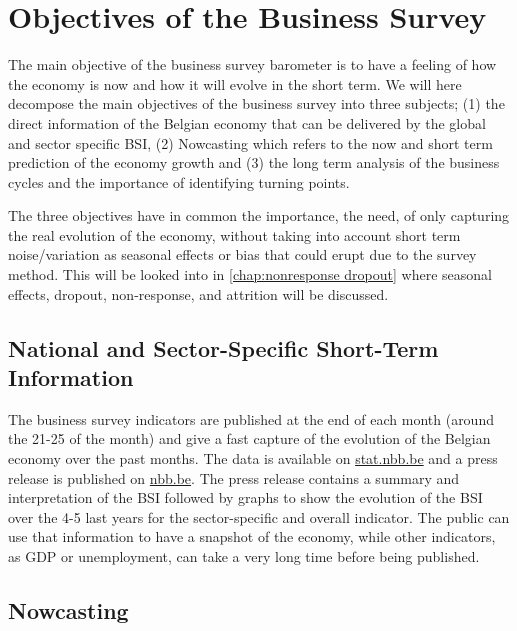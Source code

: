 \documentclass[12pt,a4paper,oneside]{book}
\begin{document}
\section{Objectives of the Business Survey}
\label{section:Objective}


The main objective of the business survey barometer is to have a feeling of how the economy is now and how it will evolve in the short term.
We will here decompose the main objectives of the business survey into three subjects; (1) the direct information of the Belgian economy that can be delivered by the global and sector specific BSI, (2) Nowcasting which refers to the now and short term prediction of the economy growth and (3) the long term analysis of the business cycles and the importance of identifying turning points.

The three objectives have in common the importance, the need,  of only capturing the real evolution of the economy, without taking into account short term noise/variation as seasonal effects or bias that could erupt due to the survey method.
This will be looked into in \autoref{chap:nonresponse dropout} where seasonal effects, dropout, non-response, and attrition will be discussed.


\subsection{National and Sector-Specific Short-Term Information}


The business survey indicators are published at the end of each month (around the 21-25 of the month) and give a fast capture of the evolution of the Belgian economy over the past months.
The data is available on \href{http://stat.nbb.be/Index.aspx?DataSetCode=BUSSURVM&Lang=en}{stat.nbb.be} and a press release is published on \href{http://www.nbb.be/doc/dq/e/conj.htm}{nbb.be}. 
The press release contains a summary and interpretation of the BSI followed by graphs to show the evolution of the BSI over the 4-5 last years for the sector-specific and overall indicator.
The public can use that information to have a snapshot of the economy, while other indicators, as GDP or unemployment, can take a very long time before being published.


\subsection{Nowcasting}
\label{sec:nowcasting}
\end{document}
